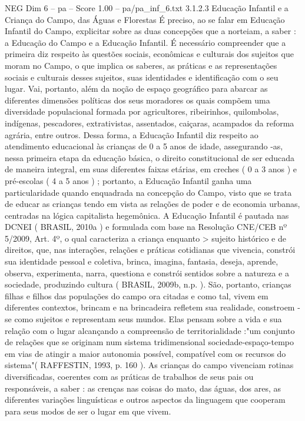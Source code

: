 \begin{textsample}{NEG Dim 6 – pa – Score 1.00 – pa/pa\_inf\_6.txt}  \label{ex:f6_neg_230}
3.1.2.3 Educação Infantil e a Criança do Campo, das Águas e Florestas É preciso, ao se falar em Educação Infantil do Campo, explicitar sobre as duas concepções que a norteiam, a saber : a Educação do Campo e a Educação Infantil.
É necessário compreender que a primeira diz respeito às questões sociais, econômicas e culturais dos sujeitos que moram no Campo, o que implica os saberes, as práticas e as representações sociais e culturais desses sujeitos, suas identidades e identificação com o seu lugar.
Vai, portanto, além da noção de espaço geográfico para abarcar as diferentes dimensões políticas dos seus moradores os quais compõem uma diversidade populacional formada por agricultores, ribeirinhos, quilombolas, indígenas, pescadores, extrativistas, assentados, caiçaras, acampados da reforma agrária, entre outros.
Dessa forma, a Educação Infantil diz respeito ao atendimento educacional às crianças de 0 a 5 anos de idade, assegurando -as, nessa primeira etapa da educação básica, o direito constitucional de ser educada de maneira integral, em suas diferentes faixas etárias, em creches ( 0 a 3 anos ) e pré-escolas ( 4 a 5 anos ) ; portanto, a Educação Infantil ganha uma particularidade quando enquadrada na concepção do Campo, visto que se trata de educar as crianças tendo em vista as relações de poder e de economia urbanas, centradas na lógica capitalista hegemônica.
A Educação Infantil é pautada nas DCNEI ( BRASIL, 2010a ) e formulada com base na Resolução CNE/CEB nº 5/2009, Art. 4º, o qual caracteriza a criança enquanto > sujeito histórico e de direitos, que, nas interações, relações e práticas cotidianas que vivencia, constrói sua identidade pessoal e coletiva, brinca, imagina, fantasia, deseja, aprende, observa, experimenta, narra, questiona e constrói sentidos sobre a natureza e a sociedade, produzindo cultura ( BRASIL, 2009b, n.p. ).
São, portanto, crianças filhas e filhos das populações do campo ora citadas e como tal, vivem em diferentes contextos, brincam e na brincadeira refletem sua realidade, constroem -se como sujeitos e representam seus mundos.
Elas pensam sobre a vida e sua relação com o lugar alcançando a compreensão de territorialidade :"um conjunto de relações que se originam num sistema tridimensional sociedade-espaço-tempo em vias de atingir a maior autonomia possível, compatível com os recursos do sistema"( RAFFESTIN, 1993, p. 160 ).
As crianças do campo vivenciam rotinas diversificadas, coerentes com as práticas de trabalhos de seus pais ou responsáveis, a saber : as crenças nas coisas do mato, das águas, dos ares, as diferentes variações linguísticas e outros aspectos da linguagem que cooperam para seus modos de ser o lugar em que vivem.

\end{textsample}
